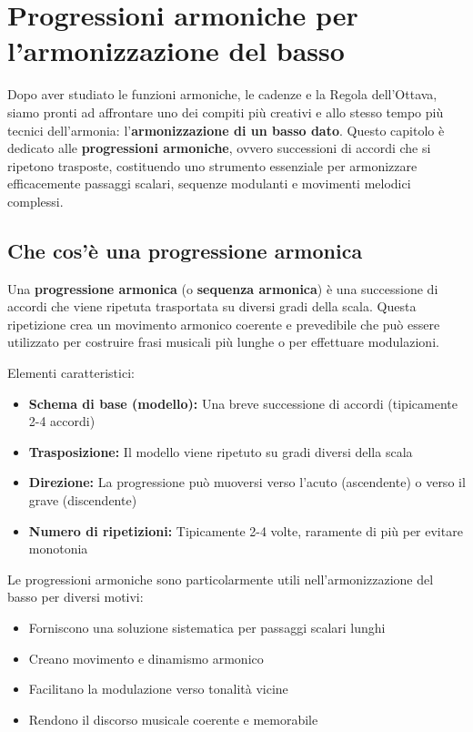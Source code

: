 \chapter{Progressioni armoniche per l'armonizzazione del basso}
\label{chap:progressioni_armoniche}

Dopo aver studiato le funzioni armoniche, le cadenze e la Regola dell'Ottava, siamo pronti ad affrontare uno dei compiti più creativi e allo stesso tempo più tecnici dell'armonia: l'\textbf{armonizzazione di un basso dato}. Questo capitolo è dedicato alle \textbf{progressioni armoniche}, ovvero successioni di accordi che si ripetono trasposte, costituendo uno strumento essenziale per armonizzare efficacemente passaggi scalari, sequenze modulanti e movimenti melodici complessi.

\section{Che cos'è una progressione armonica}
\label{sec:definizione_progressione}

\begin{definizione}
	\label{def:progressione_armonica}
	Una \textbf{progressione armonica} (o \textbf{sequenza armonica}) è una successione di accordi che viene ripetuta trasportata su diversi gradi della scala. Questa ripetizione crea un movimento armonico coerente e prevedibile che può essere utilizzato per costruire frasi musicali più lunghe o per effettuare modulazioni.
	
	Elementi caratteristici:
	\begin{itemize}
		\item \textbf{Schema di base (modello):} Una breve successione di accordi (tipicamente 2-4 accordi)
		\item \textbf{Trasposizione:} Il modello viene ripetuto su gradi diversi della scala
		\item \textbf{Direzione:} La progressione può muoversi verso l'acuto (ascendente) o verso il grave (discendente)
		\item \textbf{Numero di ripetizioni:} Tipicamente 2-4 volte, raramente di più per evitare monotonia
	\end{itemize}
\end{definizione}

Le progressioni armoniche sono particolarmente utili nell'armonizzazione del basso per diversi motivi:

\begin{itemize}
	\item Forniscono una soluzione sistematica per passaggi scalari lunghi
	\item Creano movimento e dinamismo armonico
	\item Facilitano la modulazione verso tonalità vicine
	\item Rendono il discorso musicale coerente e memorabile
\end{itemize}

